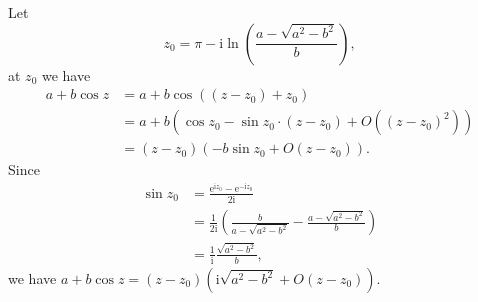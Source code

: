 \documentclass[11pt]{report}
\theoremstyle{mythm}
\let\oldendproof\endproof
\renewenvironment{proof}[1][\proofname]{%
  \oldproof[\normalfont \bfseries #1]%
}{\oldendproof}
\renewcommand*{\proofname}{Proof}
\theoremstyle{myans}
\newcommand{\mi}{\mathrm{i}}
\newcommand{\me}{\mathrm{e}}
\begin{document}
\begin{enumerate}
\begin{proof}
    Let
    \[ z_0 = \pi - \mi \ln\left( \frac{a-\sqrt{a^2-b^2}}{b} \right), \]
    at $z_0$ we have
    \begin{align*}
      a + b\cos z &= a + b\cos((z - z_0) + z_0)\\
      &= a + b(\cos z_0 - \sin z_0 \cdot (z-z_0) + O((z-z_0)^2))\\
      &= (z-z_0) (-b\sin z_0 + O(z-z_0)).
    \end{align*}
    Since
    \begin{align*}
      \sin z_0 &= \frac{\me^{\mi z_0} - \me^{-\mi z_0}}{2\mi}\\
      &= \frac 1{2\mi} \left(\frac{b}{a-\sqrt{a^2-b^2}} -\frac{a-\sqrt{a^2-b^2}}{b} \right)\\
      &= \frac 1 {\mi} \frac{\sqrt{a^2-b^2}}{b},
    \end{align*}
    we have $a + b\cos z = (z-z_0)\left(\mi \sqrt{a^2-b^2} + O(z-z_0)\right)$.


\end{proof}
\end{enumerate}
\end{document}
